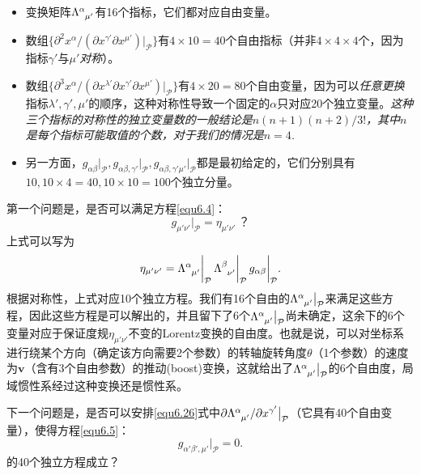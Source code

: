 \begin{itemize}
\item 变换矩阵$\Lambda\indices{^\alpha_{\mu'}}$有16个指标，它们都对应自由变量。
\item 数组$\{ \partial^2 x^\alpha / ( \partial x^{\gamma'} \partial x^{\mu'} ) \big|_{\mathcal{P}} \}$有$4 \times 10 = 40$个自由指标（并非$4 \times 4 \times 4$个，因为指标$\gamma'$与$\mu'$\textit{对称}）。
\item 数组$\{ \partial^3 x^\alpha / ( \partial x^{\lambda'} \partial x^{\gamma'} \partial x^{\mu'} ) \big|_{\mathcal{P}} \}$有$4 \times 20 = 80$个自由变量，因为可以\textit{任意更换}指标$\lambda', \gamma', \mu'$的顺序，这种对称性导致一个固定的$\alpha$只对应20个独立变量。\textit{这种三个指标的对称性的独立变量数的一般结论是$n ( n+1) (n+2) / 3!$，其中$n$是每个指标可能取值的个数，对于我们的情况是$n = 4$.}
\item 另一方面，$g_{\alpha \beta} \big|_{\mathcal{P}}, g_{\alpha \beta, \gamma'} \big|_{\mathcal{P}}, g_{\alpha \beta, \gamma' \mu'} \big|_{\mathcal{P}}$都是最初给定的，它们分别具有$10, 10\times4 = 40, 10 \times 10 = 100$个独立分量。
\end{itemize}
第一个问题是，是否可以满足方程\eqref{equ6.4}：
\begin{equation}
    g_{\mu' \nu'} \bigg|_{\mathcal{P}} = \eta_{\mu' \nu'} \ \text{？}
\label{equ6.27}
\end{equation}
上式可以写为
\begin{equation}
    \eta_{\mu' \nu'} = \Lambda\indices{^\alpha_{\mu'}}\bigg|_{\mathcal{P}} \, \Lambda\indices{^\beta_{\nu'}} \bigg|_{\mathcal{P}} \, g_{\alpha \beta} \bigg|_{\mathcal{P}}.
\label{equ6.28}
\end{equation}
根据对称性，上式对应10个独立方程。我们有16个自由的$\Lambda\indices{^\alpha_{\mu'}}\big|_{\mathcal{P}}$来满足这些方程，因此这些方程是可以解出的，并且留下了6个$\Lambda\indices{^\alpha_{\mu'}}\big|_{\mathcal{P}}$尚未确定，这余下的6个变量对应于保证度规$\eta_{\mu' \nu'}$不变的Lorentz变换的自由度。也就是说，可以对坐标系进行绕某个方向（确定该方向需要2个参数）的转轴旋转角度$\theta$（1个参数）的速度为$\bm{v}$（含有3个自由参数）的推动(boost)变换，这就给出了$\Lambda\indices{^\alpha_{\mu'}} \big|_{\mathcal{P}}$的6个自由度，局域惯性系经过这种变换还是惯性系。

下一个问题是，是否可以安排\eqref{equ6.26}式中$\partial \Lambda\indices{^\alpha_{\mu'}} / \partial x^{\gamma'} \big|_{\mathcal{P}}$（它具有40个自由变量），使得方程\eqref{equ6.5}：
\begin{equation}
    g_{\alpha' \beta' , \mu'} \bigg|_{\mathcal{P}} = 0.
\label{equ6.29}
\end{equation} 
的40个独立方程成立？

